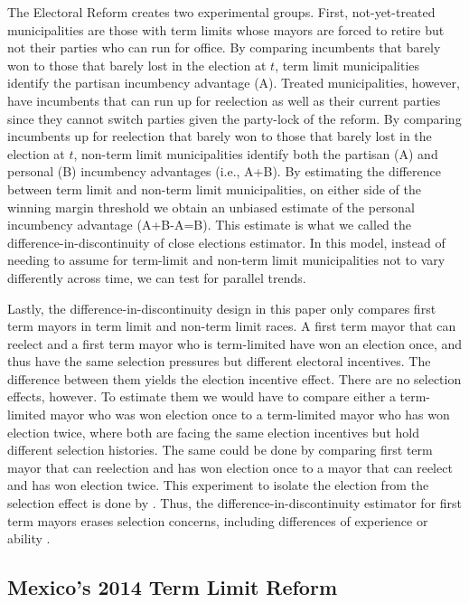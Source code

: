 The Electoral Reform creates two experimental groups. First, not-yet-treated municipalities are those with term limits whose mayors are forced to retire but not their parties who can run for office. By comparing incumbents that barely won to those that barely lost in the election at $t$, term limit municipalities identify the partisan incumbency advantage (A). Treated municipalities, however, have incumbents that can run up for reelection as well as their current parties since they cannot switch parties given the party-lock of the reform. By comparing incumbents up for reelection that barely won to those that barely lost in the election at $t$, non-term limit municipalities identify both the partisan (A) and personal (B) incumbency advantages (i.e., A+B). By estimating the difference between term limit and non-term limit municipalities, on either side of the winning margin threshold we obtain an unbiased estimate of the personal incumbency advantage (A+B-A=B). This estimate is what we called the difference-in-discontinuity of close elections estimator. In this model, instead of needing to assume for term-limit and non-term limit municipalities not to vary differently across time, we can test for parallel trends. 

Lastly, the difference-in-discontinuity design in this paper only compares first term mayors in term limit and non-term limit races. A first term mayor that can reelect and a first term mayor who is term-limited have won an election once, and thus have the same selection pressures but different electoral incentives. The difference between them yields the election incentive effect. There are no selection effects, however. To estimate them we would have to compare either a term-limited mayor who was won election once to a term-limited mayor who has won election twice, where both are facing the same election incentives but hold different selection histories. The same could be done by comparing first term mayor that can reelection and has won election once to a mayor that can reelect and has won election twice. This experiment to isolate the election from the selection effect is done by \citet{ashworth_2012}. Thus, the difference-in-discontinuity estimator for first term mayors erases selection concerns, including differences of experience or ability \citep{ferraz_finan_2008, ferraz_finan_2011}. 


\subsection{Mexico's 2014 Term Limit Reform}

